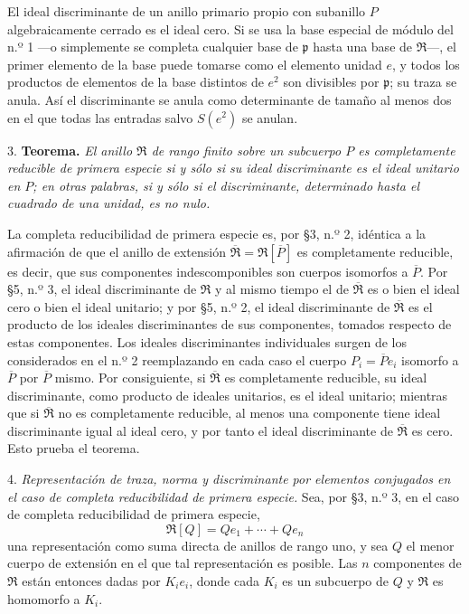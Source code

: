 \documentclass[11pt]{article}
\providecommand{\mR}{\mathfrak{R}}
\providecommand{\bR}{\overline{\mathfrak{R}}}
\providecommand{\mpideal}{\mathfrak{p}}
\providecommand{\bP}{\overline{P}}
\begin{document}
El ideal discriminante de un anillo primario propio con subanillo $P$ algebraicamente cerrado es el ideal cero. Si se usa la base especial de módulo del n.º 1 ---o simplemente se completa cualquier base de $\mpideal$ hasta una base de $\mR$---, el primer elemento de la base puede tomarse como el elemento unidad $e$, y todos los productos de elementos de la base distintos de $e^2$ son divisibles por $\mpideal$; su traza se anula. Así el discriminante se anula como determinante de tamaño al menos dos en el que todas las entradas salvo $S(e^2)$ se anulan.

3. \textbf{Teorema.} \emph{El anillo $\mR$ de rango finito sobre un subcuerpo $P$ es completamente reducible de primera especie si y sólo si su ideal discriminante es el ideal unitario en $P$; en otras palabras, si y sólo si el discriminante, determinado hasta el cuadrado de una unidad, es no nulo.}

La completa reducibilidad de primera especie es, por \S 3, n.º 2, idéntica a la afirmación de que el anillo de extensión $\bR=\mR[\bP]$ es completamente reducible, es decir, que sus componentes indescomponibles son cuerpos isomorfos a $\bP$. Por \S 5, n.º 3, el ideal discriminante de $\mR$ y al mismo tiempo el de $\bR$ es o bien el ideal cero o bien el ideal unitario; y por \S 5, n.º 2, el ideal discriminante de $\bR$ es el producto de los ideales discriminantes de sus componentes, tomados respecto de estas componentes. Los ideales discriminantes individuales surgen de los considerados en el n.º 2 reemplazando en cada caso el cuerpo $P_i=\bP e_i$ isomorfo a $\bP$ por $\bP$ mismo. Por consiguiente, si $\bR$ es completamente reducible, su ideal discriminante, como producto de ideales unitarios, es el ideal unitario; mientras que si $\bR$ no es completamente reducible, al menos una componente tiene ideal discriminante igual al ideal cero, y por tanto el ideal discriminante de $\bR$ es cero. Esto prueba el teorema.

4. \emph{Representación de traza, norma y discriminante por elementos conjugados en el caso de completa reducibilidad de primera especie.} Sea, por \S 3, n.º 3, en el caso de completa reducibilidad de primera especie,
\[
        \mR[Q]=Qe_1+\cdots+Qe_n
\]
una representación como suma directa de anillos de rango uno, y sea $Q$ el menor cuerpo de extensión en el que tal representación es posible. Las $n$ componentes de $\mR$ están entonces dadas por $K_i e_i$, donde cada $K_i$ es un subcuerpo de $Q$ y $\mR$ es homomorfo a $K_i$.
\end{document}
